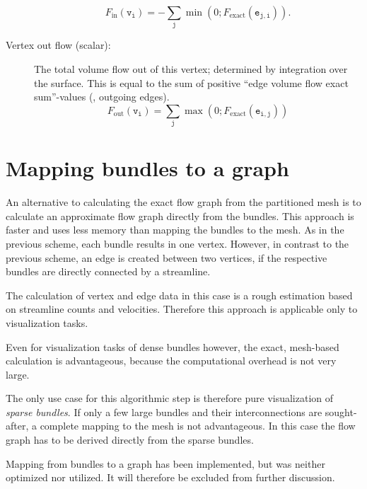 \begin{description}
%
\begin{equation}
	F_\text{in}(\mathtt{v_i}) = 
		-\sum\limits_\mathtt{j}{
			\min\left(
				0; 
				F_\text{exact}(\mathtt{e_{j,i}})
			\right)
		}.
\end{equation}
%
%
  \item[Vertex out flow (scalar):] The total volume flow out of this vertex; determined by integration over the surface. This is equal to the sum of positive ``edge volume flow exact sum''-values (\ie, outgoing edges).
%
\begin{equation}
	F_\text{out}(\mathtt{v_i}) = 
		\sum\limits_\mathtt{j}{
			\max\left(
				0; 
				F_\text{exact}(\mathtt{e_{i,j}})
			\right)
		}
\end{equation}
%
\end{description}


\section{Mapping bundles to a graph}
An alternative to calculating the exact flow graph from the partitioned \threed mesh is to calculate an approximate flow graph directly from the bundles. This approach is faster and uses less memory than mapping the bundles to the \threed mesh. As in the previous scheme, each bundle results in one vertex. However, in contrast to the previous scheme, an edge is created between two vertices, if the respective bundles are directly connected by a streamline.

The calculation of vertex and edge data in this case is a rough estimation based on streamline counts and velocities. Therefore this approach is applicable only to visualization tasks.

Even for visualization tasks of dense bundles however, the exact, mesh-based calculation is advantageous, because the computational overhead is not very large.

The only use case for this algorithmic step is therefore pure visualization of \emph{sparse bundles}. If only a few large bundles and their interconnections are sought-after, a complete mapping to the \threed mesh is not advantageous. In this case the flow graph has to be derived directly from the sparse bundles.

Mapping from bundles to a graph has been implemented, but was neither optimized nor utilized. It will therefore be excluded from further discussion.


